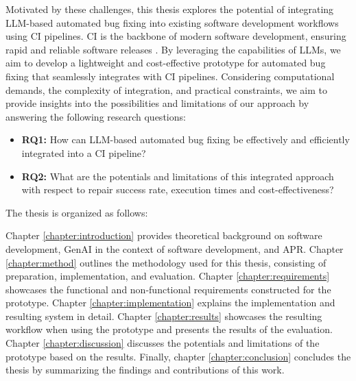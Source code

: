 Motivated by these challenges, this thesis explores the potential of integrating LLM-based automated bug fixing into existing software development workflows using \ac{CI} pipelines. \ac{CI} is the backbone of modern software development, ensuring rapid and reliable software releases \cite{ugwuezeContinuousIntegrationDeployment2024}. By leveraging the capabilities of \acp{LLM}, we aim to develop a lightweight and cost-effective prototype for automated bug fixing that seamlessly integrates with \ac{CI} pipelines. Considering computational demands, the complexity of integration, and practical constraints, we aim to provide insights into the possibilities and limitations of our approach by answering the following research questions:


\begin{itemize}
    \item \textbf{RQ1:} How can LLM-based automated bug fixing be effectively and efficiently integrated into a CI pipeline?
    \item \textbf{RQ2:} What are the potentials and limitations of this integrated approach with respect to repair success rate, execution times and cost-effectiveness?
\end{itemize}

The thesis is organized as follows:

Chapter \ref{chapter:introduction} provides theoretical background on software development, \ac{GenAI} in the context of software development, and \ac{APR}. Chapter \ref{chapter:method} outlines the methodology used for this thesis, consisting of preparation, implementation, and evaluation. Chapter \ref{chapter:requirements} showcases the functional and non-functional requirements constructed for the prototype.
Chapter \ref{chapter:implementation} explains the implementation and resulting system in detail. Chapter \ref{chapter:results} showcases the resulting workflow when using the prototype and presents the results of the evaluation. Chapter \ref{chapter:discussion} discusses the potentials and limitations of the prototype based on the results. Finally, chapter \ref{chapter:conclusion} concludes the thesis by summarizing the findings and contributions of this work.
